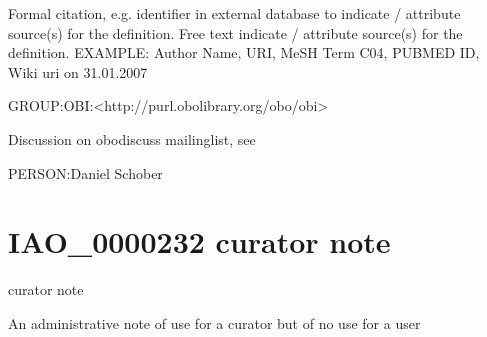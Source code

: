 \documentclass[letterpaper,10pt,english]{sphinxmanual}
\begin{document}
\begin{sphinxShadowBox}

\sphinxAtStartPar
Formal citation, e.g. identifier in external database to indicate / attribute source(s) for the definition. Free text indicate / attribute source(s) for the definition. EXAMPLE: Author Name, URI, MeSH Term C04, PUBMED ID, Wiki uri on 31.01.2007
\end{sphinxShadowBox}

\begin{sphinxShadowBox}

\sphinxAtStartPar
GROUP:OBI:\textless{}http://purl.obolibrary.org/obo/obi\textgreater{}

\sphinxAtStartPar
Discussion on obo\sphinxhyphen{}discuss mailing\sphinxhyphen{}list, see 
\end{sphinxShadowBox}

\begin{sphinxShadowBox}

\sphinxAtStartPar
PERSON:Daniel Schober
\end{sphinxShadowBox}
\begin{quote}
\label{\detokenize{doc-IAO_0000232:iao-0000232}}\label{\detokenize{doc-IAO_0000232:curator-note}}\label{\detokenize{doc-IAO_0000232:iao-0000232}}
\ignorespaces \end{quote}


\section{IAO\_0000232 \sphinxhyphen{} curator note}
\label{\detokenize{doc-IAO_0000232:iao-0000232-curator-note}}\label{\detokenize{doc-IAO_0000232:index-0}}\label{\detokenize{doc-IAO_0000232::doc}}
\begin{sphinxShadowBox}

\sphinxAtStartPar
curator note
\end{sphinxShadowBox}

\begin{sphinxShadowBox}

\sphinxAtStartPar
An administrative note of use for a curator but of no use for a user
\end{sphinxShadowBox}
\end{document}
